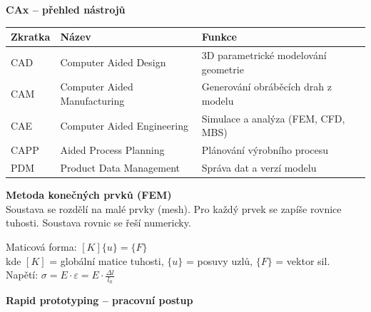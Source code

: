 \documentclass[a4paper,10pt]{article}
\begin{document}
\begin{vysvetlenibox}
\textbf{CAx -- přehled nástrojů}

\begin{center}
\begin{tabularx}{0.95\linewidth}{@{} l l X @{}}
    \toprule
    \textbf{Zkratka} & \textbf{Název} & \textbf{Funkce} \\
    \midrule
    CAD & Computer Aided Design      & 3D parametrické modelování geometrie \\
    CAM & Computer Aided Manufacturing & Generování obráběcích drah z modelu \\
    CAE & Computer Aided Engineering & Simulace a analýza (FEM, CFD, MBS) \\
    CAPP& Aided Process Planning     & Plánování výrobního procesu \\
    PDM & Product Data Management    & Správa dat a verzí modelu \\
    \bottomrule
\end{tabularx}
\end{center}

\textbf{Metoda konečných prvků (FEM)}\\
Soustava se rozdělí na malé prvky (mesh). Pro každý prvek se zapíše
rovnice tuhosti. Soustava rovnic se řeší numericky.

\begin{vzorcebox}
Maticová forma: $[K]\{u\} = \{F\}$\\
kde $[K]$ = globální matice tuhosti, $\{u\}$ = posuvy uzlů,
$\{F\}$ = vektor sil.\\
Napětí: $\sigma = E \cdot \varepsilon = E \cdot \frac{\Delta l}{l_0}$
\end{vzorcebox}

\textbf{Rapid prototyping -- pracovní postup}

\begin{center}
\end{center}


\end{vysvetlenibox}
\end{document}

